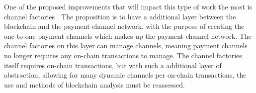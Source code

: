 One of the proposed improvements that will impact this type of work the most is channel factories \cite{burchert2017scalable}.
The proposition is to have a additional layer between the blockchain and the payment channel network, with the purpose of creating the one-to-one payment channels which makes up the payment channel network. The channel factories on this layer can manage channels, meaning payment channels no longer requires any on-chain transactions to manage. The channel factories itself requires on-chain transactions, but with such a additional layer of abstraction, allowing for many dynamic channels per on-chain transactions, the use and methods of blockchain analysis must be reassessed.
\\